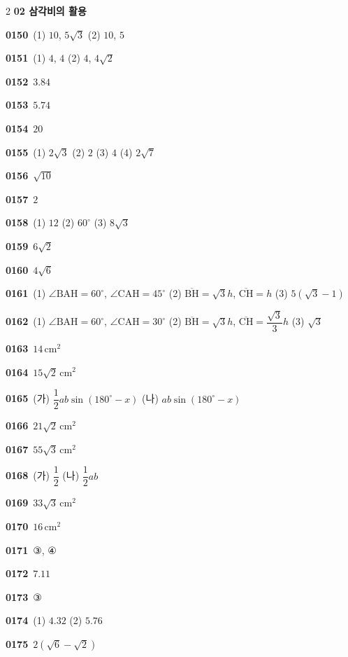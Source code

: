 \documentclass[10pt,a4paper]{article}
\newcommand{\pt}[1]{\mathrm{#1}}
\newcommand{\seg}[1]{\overline{\mathrm{#1}}}
\begin{document}
\begin{multicols}{2}
\noindent\textbf{02 삼각비의 활용}\par\smallskip
\noindent\textbf{0150}\ (1) $10$, $5\sqrt{3}$ (2) $10$, $5$\par
\noindent\textbf{0151}\ (1) $4$, $4$ (2) $4$, $4\sqrt{2}$\par
\noindent\textbf{0152}\ $3.84$\par
\noindent\textbf{0153}\ $5.74$\par
\noindent\textbf{0154}\ $20$\par
\noindent\textbf{0155}\ (1) $2\sqrt{3}$ (2) $2$ (3) $4$ (4) $2\sqrt{7}$\par
\noindent\textbf{0156}\ $\sqrt{10}$\par
\noindent\textbf{0157}\ $2$\par
\noindent\textbf{0158}\ (1) $12$ (2) $60^\circ$ (3) $8\sqrt{3}$\par
\noindent\textbf{0159}\ $6\sqrt{2}$\par
\noindent\textbf{0160}\ $4\sqrt{6}$\par
\noindent\textbf{0161}\ (1) $\angle\pt{BAH}=60^\circ$, $\angle\pt{CAH}=45^\circ$ (2) $\seg{BH}=\sqrt{3}h$, $\seg{CH}=h$ (3) $5(\sqrt{3}-1)$\par
\noindent\textbf{0162}\ (1) $\angle\pt{BAH}=60^\circ$, $\angle\pt{CAH}=30^\circ$ (2) $\seg{BH}=\sqrt{3}h$, $\seg{CH}=\dfrac{\sqrt{3}}{3}h$ (3) $\sqrt{3}$\par
\noindent\textbf{0163}\ $14\,\mathrm{cm}^2$\par
\noindent\textbf{0164}\ $15\sqrt{2}\,\mathrm{cm}^2$\par
\noindent\textbf{0165}\ (가) $\dfrac{1}{2}ab\sin(180^\circ-x)$ (나) $ab\sin(180^\circ-x)$\par
\noindent\textbf{0166}\ $21\sqrt{2}\,\mathrm{cm}^2$\par
\noindent\textbf{0167}\ $55\sqrt{3}\,\mathrm{cm}^2$\par
\noindent\textbf{0168}\ (가) $\dfrac{1}{2}$ (나) $\dfrac{1}{2}ab$\par
\noindent\textbf{0169}\ $33\sqrt{3}\,\mathrm{cm}^2$\par
\noindent\textbf{0170}\ $16\,\mathrm{cm}^2$\par
\noindent\textbf{0171}\ ③, ④\par
\noindent\textbf{0172}\ $7.11$\par
\noindent\textbf{0173}\ ③\par
\noindent\textbf{0174}\ (1) $4.32$ (2) $5.76$\par
\noindent\textbf{0175}\ $2(\sqrt{6}-\sqrt{2})$\par

\end{multicols}
\end{document}
